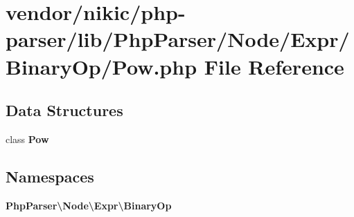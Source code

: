 \section{vendor/nikic/php-\/parser/lib/\+Php\+Parser/\+Node/\+Expr/\+Binary\+Op/\+Pow.php File Reference}
\label{_binary_op_2_pow_8php}
\subsection*{Data Structures}
\begin{DoxyCompactItemize}
\item 
class {\bf Pow}
\end{DoxyCompactItemize}
\subsection*{Namespaces}
\begin{DoxyCompactItemize}
\item 
 {\bf Php\+Parser\textbackslash{}\+Node\textbackslash{}\+Expr\textbackslash{}\+Binary\+Op}
\end{DoxyCompactItemize}
